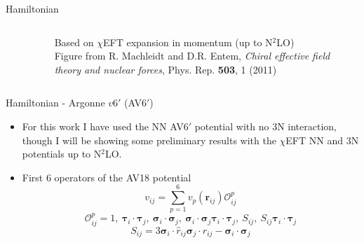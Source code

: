 \documentclass{beamer}
\renewcommand{\r}{\mathbf{r}}
\newcommand{\ti}{\bm{\tau}_i}
\newcommand{\tj}{\bm{\tau}_j}
\newcommand{\si}{\bm{\sigma}_i}
\newcommand{\sj}{\bm{\sigma}_j}
\begin{document}
\begin{frame}{Hamiltonian}
\begin{columns}
\begin{column}{0.5\textwidth}
\begin{figure}
\end{figure}
\end{column}
\begin{column}{0.5\textwidth}
   Based on $\chi$EFT expansion in momentum (up to N$^2$LO)
   {\\ \tiny Figure from R. Machleidt and D.R. Entem, {\it Chiral effective field theory and nuclear forces}, Phys. Rep. {\bf 503}, 1 (2011)}
\end{column}
\end{columns}
\end{frame}

\begin{frame}{Hamiltonian - Argonne $v6'$ (AV6$'$)}
\begin{itemize}
   \item For this work I have used the NN AV6$'$ potential with no 3N interaction, though I will be showing some preliminary results with the $\chi$EFT NN and 3N potentials up to N$^2$LO.
   \item First 6 operators of the AV18 potential
   \begin{equation*}
      v_{ij} = \sum\limits_{p=1}^6 v_p(\r_{ij})\mathcal{O}^p_{ij}
   \end{equation*}
   \begin{equation*}
      \mathcal{O}^p_{ij} = 1,~\ti\cdot\tj,~\si\cdot\sj,~\si\cdot\sj\ti\cdot\tj,~S_{ij},~S_{ij}\ti\cdot\tj
   \end{equation*}
   \begin{equation*}
      S_{ij} = 3\si\cdot\hat{r}_{ij}\sj\cdot\hat{r}_{ij}-\si\cdot\sj
   \end{equation*}
\end{itemize}
\end{frame}
\end{document}
